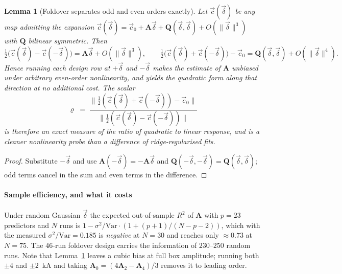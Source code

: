 \documentclass[11pt,a4paper]{article}
\newcommand{\vect}[1]{\mathbf{#1}}
\theoremstyle{plain}
\newtheorem{lemma}[proposition]{Lemma}
\theoremstyle{definition}
\theoremstyle{remark}
\begin{document}
\begin{lemma}[Foldover separates odd and even orders exactly]
\label{lem:foldover}
Let $\vec{c}(\vec\delta)$ be any map admitting the expansion
$\vec{c}(\vec\delta) = \vec{c}_0 + \vect{A}\vec\delta + \vect{Q}(\vec\delta,\vec\delta)
+ O(\|\vec\delta\|^3)$ with $\vect{Q}$ bilinear symmetric. Then
\begin{equation}
\label{eq:foldover}
\tfrac12\bigl(\vec{c}(\vec\delta)-\vec{c}(-\vec\delta)\bigr)
= \vect{A}\vec\delta + O(\|\vec\delta\|^3),
\qquad
\tfrac12\bigl(\vec{c}(\vec\delta)+\vec{c}(-\vec\delta)\bigr) - \vec{c}_0
= \vect{Q}(\vec\delta,\vec\delta) + O(\|\vec\delta\|^4).
\end{equation}
Hence running each design row at $+\vec\delta$ and $-\vec\delta$ makes the
estimate of $\vect{A}$ unbiased under \emph{arbitrary} even-order nonlinearity,
and yields the quadratic form along that direction at no additional cost. The
scalar
\begin{equation}
\label{eq:rho}
\varrho \;=\;
\frac{\bigl\|\tfrac12(\vec{c}(\vec\delta)+\vec{c}(-\vec\delta))-\vec{c}_0\bigr\|}
     {\bigl\|\tfrac12(\vec{c}(\vec\delta)-\vec{c}(-\vec\delta))\bigr\|}
\end{equation}
is therefore an exact measure of the ratio of quadratic to linear response, and
is a cleaner nonlinearity probe than a difference of ridge-regularised fits.
\end{lemma}

\begin{proof}
Substitute $-\vec\delta$ and use $\vect{A}(-\vec\delta) = -\vect{A}\vec\delta$
and $\vect{Q}(-\vec\delta,-\vec\delta) = \vect{Q}(\vec\delta,\vec\delta)$; odd
terms cancel in the sum and even terms in the difference.
\end{proof}

\paragraph{Sample efficiency, and what it costs}
Under random Gaussian $\vec\delta$ the expected out-of-sample $R^2$ of
$\vect{A}$ with $p=23$ predictors and $N$ runs is
$1-\sigma^2/\mathrm{Var}\cdot(1+(p+1)/(N-p-2))$, which with the measured
$\sigma^2/\mathrm{Var} = 0.185$ is \emph{negative} at $N=30$ and reaches only
$\approx0.73$ at $N=75$. The $46$-run foldover design carries the information of
$230$--$250$ random runs. Note that Lemma~\ref{lem:foldover} leaves a cubic bias
at full box amplitude; running both $\pm4$ and $\pm2$~kA and taking
$\vect{A}_0 = (4\vect{A}_2-\vect{A}_4)/3$ removes it to leading order.
\end{document}
